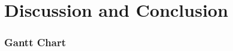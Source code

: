\chapter{Discussion and Conclusion} \label{sec:discussion_and_conclusion}
    
    
        
        
        \subsection{Gantt Chart} \label{sec:gantt_chart}
            
